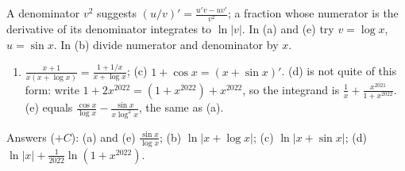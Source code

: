 \documentclass[11pt,a4paper]{article}
\begin{document}
A denominator \(v^2\) suggests \((u/v)'=\frac{u'v-uv'}{v^2}\); a fraction whose numerator is the derivative of its denominator integrates to \(\ln\lvert v\rvert\). In (a) and (e) try \(v=\log x\), \(u=\sin x\). In (b) divide numerator and denominator by \(x\).
\begin{enumerate}
\def\labelenumi{(\alph{enumi})}
\setcounter{enumi}{1}
\tightlist
\item
  \(\frac{x+1}{x(x+\log x)}=\frac{1+1/x}{x+\log x}\); (c) \(1+\cos x=(x+\sin x)'\). (d) is not quite of this form: write \(1+2x^{2022}=(1+x^{2022})+x^{2022}\), so the integrand is \(\frac1x+\frac{x^{2021}}{1+x^{2022}}\). (e) equals \(\frac{\cos x}{\log x}-\frac{\sin x}{x\log^2x}\), the same as (a).
\end{enumerate}
Answers (\(+C\)): (a) and (e) \(\frac{\sin x}{\log x}\); (b) \(\ln\lvert x+\log x\rvert\); (c) \(\ln\lvert x+\sin x\rvert\); (d) \(\ln\lvert x\rvert+\frac1{2022}\ln(1+x^{2022})\).
\end{document}
